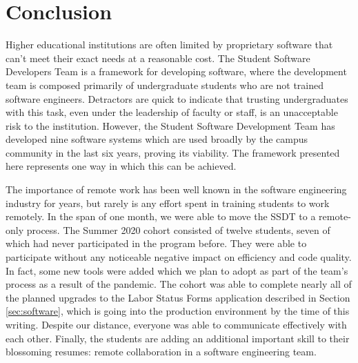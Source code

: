 \section{Conclusion}

Higher educational institutions are often limited by proprietary software that can't meet their exact needs at a reasonable cost. The Student Software Developers Team is a framework for developing software, where the development team is composed primarily of undergraduate students who are not trained software engineers. Detractors are quick to indicate that trusting undergraduates with this task, even under the leadership of faculty or staff, is an unacceptable risk to the institution. However, the Student Software Development Team has developed nine software systems which are used broadly by the campus community in the last six years, proving its viability. The framework presented here represents one way in which this can be achieved.

The importance of remote work has been well known in the software engineering industry for years, but rarely is any effort spent in training students to work remotely. In the span of one month, we were able to move the SSDT to a remote-only process. The Summer 2020 cohort consisted of twelve students, seven of which had never participated in the program before. They were able to participate without any noticeable negative impact on efficiency and code quality. In fact, some new tools were added which we plan to adopt as part of the team's process as a result of the pandemic. The cohort was able to complete nearly all of the planned upgrades to the Labor Status Forms application described in Section \ref{sec:software}, which is going into the production environment by the time of this writing. Despite our distance, everyone was able to communicate effectively with each other. Finally, the students are adding an additional important skill to their blossoming resumes: remote collaboration in a software engineering team.
